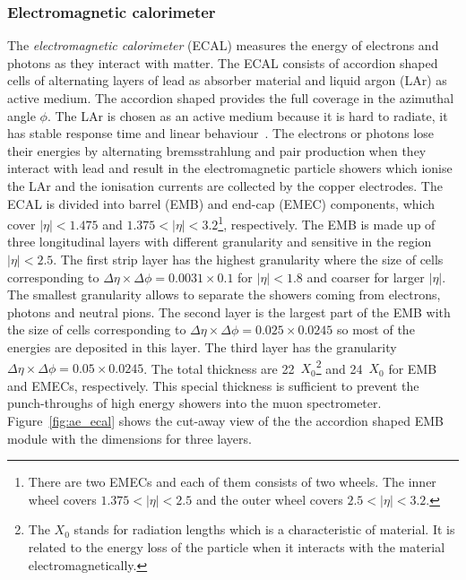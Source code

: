 
\subsubsection{Electromagnetic calorimeter}
\label{subsubsec:ae_ecal}
The \textit{electromagnetic calorimeter} (ECAL) measures the energy of electrons and photons as they interact with matter.
The ECAL consists of accordion shaped cells of alternating layers of lead as absorber material and liquid argon (LAr) as active medium.
The accordion shaped provides the full coverage in the azimuthal angle $\phi$.
The LAr is chosen as an active medium because it is hard to radiate, it has stable response time and linear behaviour~\cite{1748-0221-3-08-S08003}.
The electrons or photons lose their energies by alternating bremsstrahlung and pair production when they interact with lead and result in the electromagnetic particle showers which ionise the LAr and the ionisation currents are collected by the copper electrodes.
The ECAL is divided into barrel (EMB) and end-cap (EMEC) components, which cover $|\eta| < 1.475$ and $1.375 < |\eta| < 3.2$\footnote{There are two EMECs and each of them consists of two wheels. The inner wheel covers $1.375 < |\eta| < 2.5$ and the outer wheel covers $2.5 < |\eta| < 3.2$.}, respectively.
The EMB is made up of three longitudinal layers with different granularity and sensitive in the region $|\eta| < 2.5$.
The first strip layer has the highest granularity where the size of cells corresponding to $\Delta \eta \times \Delta \phi = 0.0031 \times 0.1$ for $|\eta| < 1.8$ and coarser for larger $|\eta|$.
The smallest granularity allows to separate the showers coming from electrons, photons and neutral pions.
The second layer is the largest part of the EMB with the size of cells corresponding to $\Delta \eta \times \Delta \phi = 0.025 \times 0.0245$ so most of the energies are deposited in this layer.
The third layer has the granularity $\Delta \eta \times \Delta \phi = 0.05 \times 0.0245$.
The total thickness are 22~$X_{0}$\footnote{The $X_{0}$ stands for radiation lengths which is a characteristic of material. It is related to the energy loss of the particle when it interacts with the material electromagnetically.} and 24~$X_{0}$ for EMB and EMECs, respectively.
This special thickness is sufficient to prevent the punch-throughs of high energy showers into the muon spectrometer.
Figure~\ref{fig:ae_ecal} shows the cut-away view of the the accordion shaped EMB module with the dimensions for three layers.

